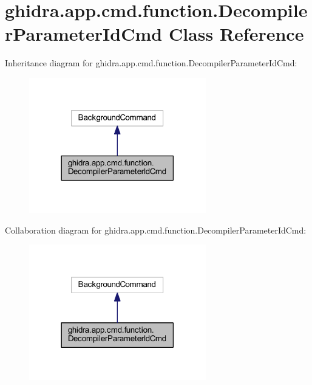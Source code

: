 \hypertarget{classghidra_1_1app_1_1cmd_1_1function_1_1_decompiler_parameter_id_cmd}{}\section{ghidra.\+app.\+cmd.\+function.\+Decompiler\+Parameter\+Id\+Cmd Class Reference}
\label{classghidra_1_1app_1_1cmd_1_1function_1_1_decompiler_parameter_id_cmd}


Inheritance diagram for ghidra.\+app.\+cmd.\+function.\+Decompiler\+Parameter\+Id\+Cmd\+:
\nopagebreak
\begin{figure}[H]
\begin{center}
\leavevmode
\includegraphics[width=218pt]{classghidra_1_1app_1_1cmd_1_1function_1_1_decompiler_parameter_id_cmd__inherit__graph}
\end{center}
\end{figure}


Collaboration diagram for ghidra.\+app.\+cmd.\+function.\+Decompiler\+Parameter\+Id\+Cmd\+:
\nopagebreak
\begin{figure}[H]
\begin{center}
\leavevmode
\includegraphics[width=218pt]{classghidra_1_1app_1_1cmd_1_1function_1_1_decompiler_parameter_id_cmd__coll__graph}
\end{center}
\end{figure}
